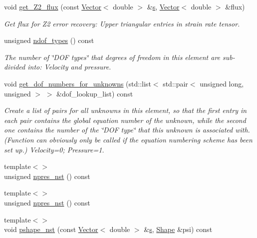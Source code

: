 \begin{DoxyCompactItemize}
void \hyperlink{classoomph_1_1GeneralisedNewtonianTTaylorHoodElement_a7089cf0349c047adcb4d600c4bdc66cc}{get\+\_\+\+Z2\+\_\+flux} (const \hyperlink{classoomph_1_1Vector}{Vector}$<$ double $>$ \&\hyperlink{cfortran_8h_ab7123126e4885ef647dd9c6e3807a21c}{s}, \hyperlink{classoomph_1_1Vector}{Vector}$<$ double $>$ \&flux)
\begin{DoxyCompactList}\small\item\em Get \textquotesingle{}flux\textquotesingle{} for Z2 error recovery\+: Upper triangular entries in strain rate tensor. \end{DoxyCompactList}\item 
unsigned \hyperlink{classoomph_1_1GeneralisedNewtonianTTaylorHoodElement_a81b2d392a53657754788c4b9ab3858c1}{ndof\+\_\+types} () const
\begin{DoxyCompactList}\small\item\em The number of \char`\"{}\+D\+O\+F types\char`\"{} that degrees of freedom in this element are sub-\/divided into\+: Velocity and pressure. \end{DoxyCompactList}\item 
void \hyperlink{classoomph_1_1GeneralisedNewtonianTTaylorHoodElement_aae85d62a6cf20353fa93b75dc8f5182b}{get\+\_\+dof\+\_\+numbers\+\_\+for\+\_\+unknowns} (std\+::list$<$ std\+::pair$<$ unsigned long, unsigned $>$ $>$ \&dof\+\_\+lookup\+\_\+list) const
\begin{DoxyCompactList}\small\item\em Create a list of pairs for all unknowns in this element, so that the first entry in each pair contains the global equation number of the unknown, while the second one contains the number of the \char`\"{}\+D\+O\+F type\char`\"{} that this unknown is associated with. (Function can obviously only be called if the equation numbering scheme has been set up.) Velocity=0; Pressure=1. \end{DoxyCompactList}\item 
{\footnotesize template$<$$>$ }\\unsigned \hyperlink{classoomph_1_1GeneralisedNewtonianTTaylorHoodElement_a7097f7c345da00bebde2b6826ed8559b}{npres\+\_\+nst} () const
\item 
{\footnotesize template$<$$>$ }\\unsigned \hyperlink{classoomph_1_1GeneralisedNewtonianTTaylorHoodElement_aad5747c86300924ad3dfdf0144fa4c74}{npres\+\_\+nst} () const
\item 
{\footnotesize template$<$$>$ }\\void \hyperlink{classoomph_1_1GeneralisedNewtonianTTaylorHoodElement_ad796a7d9a9a43ea9ea8451c620c10325}{pshape\+\_\+nst} (const \hyperlink{classoomph_1_1Vector}{Vector}$<$ double $>$ \&\hyperlink{cfortran_8h_ab7123126e4885ef647dd9c6e3807a21c}{s}, \hyperlink{classoomph_1_1Shape}{Shape} \&psi) const

\end{DoxyCompactItemize}
